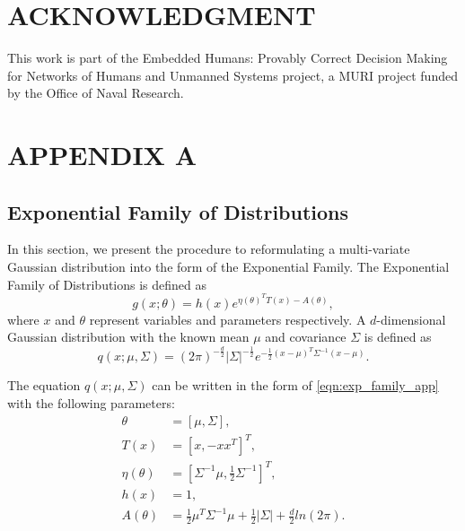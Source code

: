 \documentclass[twocolumn,10pt]{asme2e}
\begin{document}
\section*{ACKNOWLEDGMENT}
This work is part of the Embedded Humans: Provably Correct Decision Making for Networks of Humans and Unmanned Systems project, a MURI project funded by the Office of Naval Research.

\appendix
\section*{APPENDIX A}\label{append_a}

\subsection*{Exponential Family of Distributions}\label{app:exp_family}
In this section, we present the procedure to reformulating a multi-variate Gaussian distribution into the form of the Exponential Family.
The Exponential Family of Distributions is defined as
\begin{equation}\label{eqn:exp_family_app}
g(x;\theta)=h(x)e^{\eta(\theta)^TT(x)-A(\theta)},
\end{equation}
where $x$ and $\theta$ represent variables and parameters respectively.
A $d$-dimensional Gaussian distribution with the known mean $\mu$ and covariance $\Sigma$ is defined as
\begin{equation*}
q(x;\mu,\Sigma)=(2\pi)^{-\frac{d}{2}}|\Sigma|^{-\frac{1}{2}}e^{-\frac{1}{2}(x-\mu)^T\Sigma^{-1}(x-\mu)}.
\end{equation*}

The equation $q(x;\mu,\Sigma)$ can be written in the form of \cref{eqn:exp_family_app} with the following parameters:
\begin{subequations}\label{eqn:N2exp_para_app}
	\begin{align}
	\theta&=\left[\mu,\Sigma\right],\\
	T(x)&=\left[ x,-xx^T\right]^T,\\
	\eta(\theta)&=\left[\Sigma^{-1}\mu,\frac{1}{2}\Sigma^{-1}\right]^T, \label{symb:eta_theta}\\
	h(x)&=1,\\
	A(\theta)&=\frac{1}{2}\mu^T\Sigma^{-1}\mu+\frac{1}{2}|\Sigma|+\frac{d}{2}ln(2\pi).\label{symb:A_theta}
	\end{align}
\end{subequations}
\end{document}
